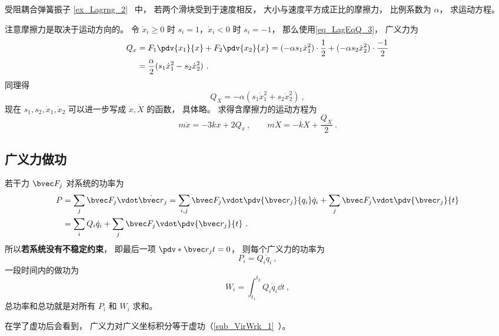 \begin{example}{受阻耦合弹簧振子}
\autoref{ex_Lagrng_2}~ 中， 若两个滑块受到于速度相反， 大小与速度平方成正比的摩擦力， 比例系数为 $\alpha$， 求运动方程。

注意摩擦力是取决于运动方向的。 令 $\dot x_i \geqslant 0$ 时 $s_i = 1$，$\dot x_i < 0$ 时 $s_i = -1$， 那么使用\autoref{eq_LagEqQ_3}， 广义力为
\begin{equation}
\begin{aligned}
Q_x &= F_1 \pdv{x_1}{x} + F_2 \pdv{x_2}{x} = (-\alpha s_1\dot x_1^2) \cdot \frac{1}{2} + (-\alpha s_2\dot x_2^2) \cdot \frac{-1}{2}\\
&= \frac{\alpha}{2}(s_1\dot x_1^2 - s_2 \dot x_2^2)~.
\end{aligned}
\end{equation}
同理得
\begin{equation}
Q_X = -\alpha(s_1 \dot x_1^2 + s_2\dot x_2^2)~,
\end{equation}
现在 $s_1,s_2,\dot x_1,\dot x_2$ 可以进一步写成 $\dot x, \dot X$ 的函数， 具体略。 求得含摩擦力的运动方程为
\begin{equation}
m\ddot x =  - 3kx + 2Q_x~, \qquad
m\ddot X =  - kX + \frac{Q_X}{2}~.
\end{equation}
\end{example}

\subsection{广义力做功}\label{sub_LagEqQ_1}
若干力 $\bvec F_j$ 对系统的功率为
\begin{equation}\label{eq_LagEqQ_5}
\begin{aligned}
P &= \sum_j \bvec F_j \vdot \dot{\bvec r}_j
= \sum_{i,j} \bvec F_j \vdot \pdv{\bvec r_j}{q_i}\dot q_i + \sum_j \bvec F_j \vdot \pdv{\bvec r_j}{t}\\
&= \sum_i Q_i \dot q_i + \sum_j \bvec F_j \vdot \pdv{\bvec r_j}{t}~.
\end{aligned}
\end{equation}
所以\textbf{若系统没有不稳定约束}， 即最后一项 $\pdv*{\bvec r_j}{t} = 0$， 则每个广义力的功率为
\begin{equation}
P_i = Q_i \dot q_i~,
\end{equation}
一段时间内的做功为
\begin{equation}
W_i = \int_{t_1}^{t_2} Q_i \dot q_i \dd{t}~,
\end{equation}
总功率和总功就是对所有 $P_i$ 和 $W_i$ 求和。

在学了虚功后会看到， 广义力对广义坐标积分等于虚功（\autoref{sub_VirWrk_1}~）。
